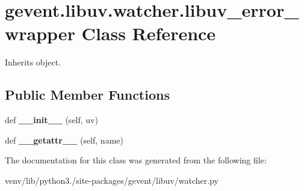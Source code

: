 \hypertarget{classgevent_1_1libuv_1_1watcher_1_1libuv__error__wrapper}{}\section{gevent.\+libuv.\+watcher.\+libuv\+\_\+error\+\_\+wrapper Class Reference}
\label{classgevent_1_1libuv_1_1watcher_1_1libuv__error__wrapper}


Inherits object.

\subsection*{Public Member Functions}
\begin{DoxyCompactItemize}
\item 
\mbox{\label{classgevent_1_1libuv_1_1watcher_1_1libuv__error__wrapper_a8683c23a29ad28fe4630e3717de7baad}} 
def {\bfseries \+\_\+\+\_\+init\+\_\+\+\_\+} (self, uv)
\item 
\mbox{\label{classgevent_1_1libuv_1_1watcher_1_1libuv__error__wrapper_a2a7541987b077e698051c1710ddf8865}} 
def {\bfseries \+\_\+\+\_\+getattr\+\_\+\+\_\+} (self, name)
\end{DoxyCompactItemize}


The documentation for this class was generated from the following file\+:\begin{DoxyCompactItemize}
\item 
venv/lib/python3./site-\/packages/gevent/libuv/watcher.\+py\end{DoxyCompactItemize}
